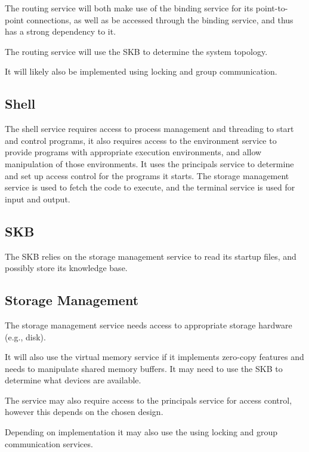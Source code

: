 \documentclass[a4paper,twoside]{report} %
\begin{document}
The routing service will both make use of the binding service for its
point-to-point connections, as well as be accessed through the binding
service, and thus has a strong dependency to it.

The routing service will use the SKB to determine the system topology.

It will likely also be implemented using locking and group
communication.

\subsection{Shell}

The shell service requires access to process management and threading
to start and control programs, it also requires access to the
environment service to provide programs with appropriate execution
environments, and allow manipulation of those environments. It uses
the principals service to determine and set up access control for the
programs it starts.  The storage management service is used to fetch
the code to execute, and the terminal service is used for input and output.

\subsection{SKB}

The SKB relies on the storage management service to read its startup
files, and possibly store its knowledge base.

\subsection{Storage Management}

The storage management service needs access to appropriate storage
hardware (e.g., disk). 

It will also use the virtual memory service if it implements zero-copy
features and needs to manipulate shared memory buffers. It may need to
use the SKB to determine what devices are available.

The service may also require access to the
principals service for access control, however this depends on the
chosen design.

Depending on implementation it may also use the using locking and group
communication services.
\end{document}
